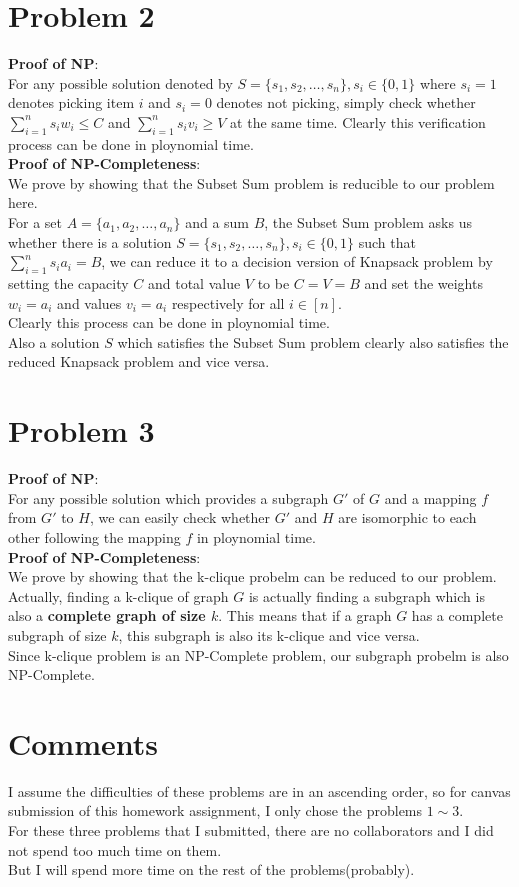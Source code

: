 \documentclass[12pt,letterpaper]{article}
\begin{document}
\section*{Problem 2}
\textbf{Proof of NP}:\\
For any possible solution denoted by $S=\{s_1,s_2,\dots,s_n\}, s_i\in \{0,1\}$ 
where $s_i=1$ denotes picking item $i$ and $s_i=0$ denotes not picking,
simply check whether $\sum_{i=1}^{n}s_iw_i\leq C$ and $\sum_{i=1}^{n}s_iv_i\geq V$
at the same time. 
Clearly this verification process can be done in ploynomial time.\\
\textbf{Proof of NP-Completeness}:\\
We prove by showing that the Subset Sum problem is reducible to our problem here.\\
For a set $A=\{a_1,a_2,\dots,a_n\}$ and a sum $B$,
the Subset Sum problem asks us whether there is a solution $S=\{s_1,s_2,\dots,s_n\}, s_i\in \{0,1\}$
such that $\sum_{i=1}^{n}s_ia_i=B$,
we can reduce it to a decision version of Knapsack problem
by setting the capacity $C$ and total value $V$ to be $C=V=B$
and set the weights $w_i=a_i$ and values $v_i=a_i$ respectively for all $i\in[n]$.\\
Clearly this process can be done in ploynomial time.\\
Also a solution $S$ which satisfies the Subset Sum problem 
clearly also satisfies the reduced Knapsack problem and vice versa.\\


\section*{Problem 3}
\textbf{Proof of NP}:\\
For any possible solution which provides a subgraph $G'$ of $G$ 
and a mapping $f$ from $G'$ to $H$,
we can easily check whether $G'$ and $H$ are isomorphic to each other 
following the mapping $f$ in ploynomial time. \\
\textbf{Proof of NP-Completeness}:\\
We prove by showing that the k-clique probelm can be reduced to our problem.\\
Actually, finding a k-clique of graph $G$ is actually finding a 
subgraph which is also a \textbf{complete graph of size $k$}.
This means that if a graph $G$ has a complete subgraph of size $k$,
this subgraph is also its k-clique and vice versa.\\
Since k-clique problem is an NP-Complete problem,
our subgraph probelm is also NP-Complete. 


\newpage
\section*{Comments}
I assume the difficulties of these problems are in an ascending order,
so for canvas submission of this homework assignment, 
I only chose the problems $1\sim 3$.\\
For these three problems that I submitted,
there are no collaborators and I did not spend too much time on them.\\
But I will spend more time on the rest of the problems(probably).
\end{document}
